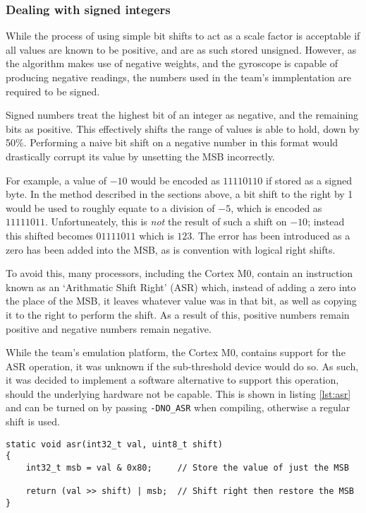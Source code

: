 \subsubsection{Dealing with signed integers \label{sec:asr}}

While the process of using simple bit shifts to act as a scale factor is acceptable if all values are known to be positive, and are as such stored unsigned. However, as the algorithm makes use of negative weights, and the gyroscope is capable of producing negative readings, the numbers used in the team's immplentation are required to be signed.

Signed numbers treat the highest bit of an integer as negative, and the remaining bits as positive. This effectively shifts the range of values is able to hold, down by 50\%. Performing a naive bit shift on a negative number in this format would drastically corrupt its value by unsetting the MSB incorrectly.

For example, a value of $-10$ would be encoded as $11110110$ if stored as a signed byte. In the method described in the sections above, a bit shift to the right by 1 would be used to roughly equate to a division of $-5$, which is encoded as $11111011$. Unfortuneately, this is \textit{not} the result of such a shift on $-10$; instead this shifted becomes $01111011$ which is $123$. The error has been introduced as a zero has been added into the MSB, as is convention with logical right shifts.

To avoid this, many processors, including the Cortex M0, contain an instruction known as an `Arithmatic Shift Right' (ASR) which, instead of adding a zero into the place of the MSB, it leaves whatever value was in that bit, as well as copying it to the right to perform the shift. As a result of this, positive numbers remain positive and negative numbers remain negative.

While the team's emulation platform, the Cortex M0, contains support for the ASR operation, it was unknown if the sub-threshold device would do so. As such, it was decided to implement a software alternative to support this operation, should the underlying hardware not be capable. This is shown in listing \ref{lst:asr} and can be turned on by passing \verb|-DNO_ASR| when compiling, otherwise a regular shift is used.

\begin{lstlisting}[caption={Software Arthmatic Shift Right Support},label={lst:asr}]
static void asr(int32_t val, uint8_t shift)
{
    int32_t msb = val & 0x80;     // Store the value of just the MSB

    return (val >> shift) | msb;  // Shift right then restore the MSB
}
\end{lstlisting}